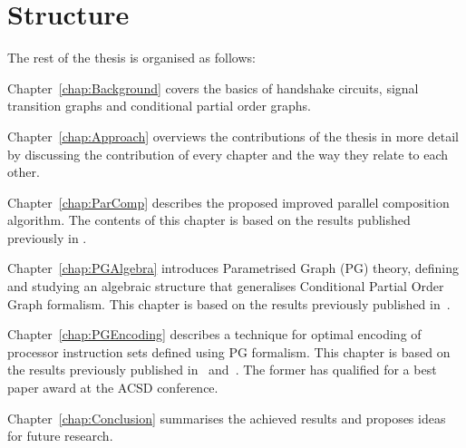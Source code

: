 \section{Structure}

The rest of the thesis is organised as follows:

Chapter~\ref{chap:Background} covers the basics of handshake circuits, signal transition graphs and conditional partial order graphs.

Chapter~\ref{chap:Approach} overviews the contributions of the thesis in more detail by discussing the contribution of every chapter and the way they relate to each other.

Chapter~\ref{chap:ParComp} describes the proposed improved parallel composition algorithm. The contents of this chapter is based on the results published previously in \cite{improved_par_comp}.

Chapter~\ref{chap:PGAlgebra} introduces Parametrised Graph (PG) theory, defining and studying an algebraic structure that generalises Conditional Partial Order Graph formalism. This chapter is based on the results previously published in~\cite{pg_algebra}.

Chapter~\ref{chap:PGEncoding} describes a technique for optimal encoding of processor instruction sets defined using PG formalism. This chapter is based on the results previously published in~\cite{cpog_encoding_best_paper} and~\cite{cpog_encoding}. The former has qualified for a best paper award at the ACSD conference.

Chapter~\ref{chap:Conclusion} summarises the achieved results and proposes ideas for future research.
